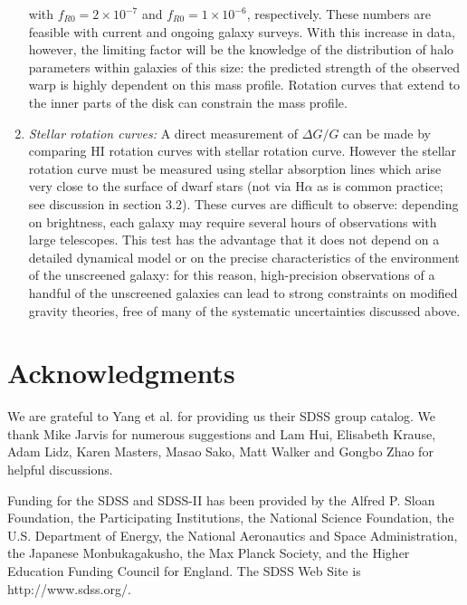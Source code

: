 \documentclass[useAMS,usenatbib,twocolumn]{mn2e}
\newcommand{\ha}{H$\alpha$}
\begin{document}
\begin{enumerate}
  with $f_{R0} = 2\times10^{-7}$ and $f_{R0} = 1\times10^{-6}$, respectively.
  These numbers are feasible with  current and ongoing galaxy surveys.
  With this increase in data, however, the limiting factor will be the
  knowledge of the distribution of halo parameters within galaxies of this
  size: the predicted strength of the observed warp is highly dependent on
  this mass profile. Rotation curves that extend to the inner parts of the disk
can
  constrain the mass profile. 
\item {\it Stellar rotation curves: }
  A direct measurement of $\Delta G/G$ can be made by
  comparing HI rotation curves with stellar rotation curve. However 
  the stellar rotation curve must be measured using stellar absorption
  lines which arise very close to the surface of dwarf stars (not via 
  \ha{} as is common practice; see discussion in section 3.2).  These curves
  are difficult to observe: depending on brightness, each galaxy may require
  several hours of observations with large telescopes. This test
  has the advantage that it does not depend on a detailed dynamical model
  or on the precise characteristics of the environment of the unscreened
  galaxy: for this reason, high-precision observations of
  a handful of the unscreened galaxies can lead to strong constraints on
  modified gravity theories, free of many of the systematic uncertainties
  discussed above.
\end{enumerate}


\section{Acknowledgments}
We are grateful to Yang et al. for providing us their SDSS group catalog.  
We thank Mike Jarvis for numerous suggestions and Lam Hui, 
Elisabeth Krause, Adam Lidz, Karen Masters, Masao Sako, 
Matt Walker and Gongbo Zhao for helpful
discussions. 

Funding for the SDSS and SDSS-II has been provided by the Alfred P. Sloan
Foundation, the Participating Institutions, the National Science Foundation,
the U.S. Department of Energy, the National Aeronautics and Space
Administration, the Japanese Monbukagakusho, the Max Planck Society, and the
Higher Education Funding Council for England. The SDSS Web Site is
http://www.sdss.org/.
\end{document}

